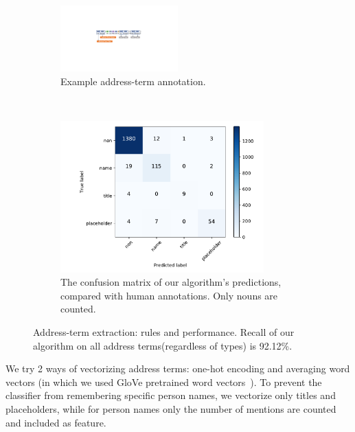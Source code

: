 \begin{figure}[th]
	\centering
	\begin{subfigure}[t]{0.5\textwidth}
		\centering
		\includegraphics[height=1in]{add-sample.pdf}
		\caption{Example address-term annotation.}
	\end{subfigure}%
	\\
	\begin{subfigure}[t]{0.5\textwidth}
		\centering
		\includegraphics[height=2.3in]{confusion.pdf}
		\caption{The confusion matrix of our algorithm's predictions, compared with human annotations. Only nouns are counted.}
	\end{subfigure}
	\caption{Address-term extraction: rules and performance. Recall of our algorithm on all address terms(regardless of types) is 92.12\%.}\label{fig:address}
\end{figure}

We try 2 ways of vectorizing address terms: one-hot encoding and 
averaging word vectors (in which we used GloVe pretrained word 
vectors~\cite{glove}). To prevent the classifier from remembering specific person names, 
we vectorize only titles and placeholders, 
while for person names only the number of mentions are counted and
included as feature.

